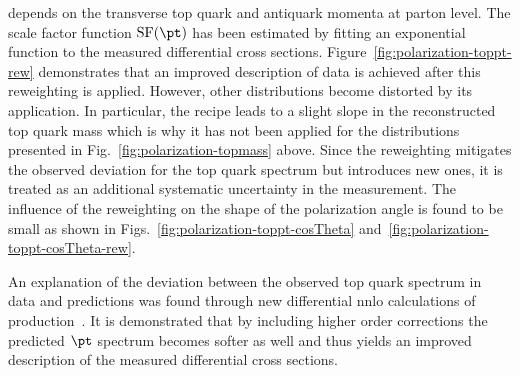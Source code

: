 depends on the transverse top quark and antiquark momenta at parton level. The scale factor function $\mathrm{SF}(\pt)$ has been estimated by fitting an exponential function to the measured differential \ttbar cross sections. Figure~\ref{fig:polarization-toppt-rew} demonstrates that an improved description of data is achieved after this reweighting is applied. However, other distributions become distorted by its application. In particular, the recipe leads to a slight slope in the reconstructed top quark mass which is why it has not been applied for the distributions presented in Fig.~\ref{fig:polarization-topmass} above. Since the reweighting mitigates the observed deviation for the top quark \pt spectrum but introduces new ones, it is treated as an additional systematic uncertainty in the measurement. The influence of the reweighting on the shape of the polarization angle is found to be small as shown in Figs.~\ref{fig:polarization-toppt-cosTheta} and~\ref{fig:polarization-toppt-cosTheta-rew}.


An explanation of the deviation between the observed top quark \pt spectrum in data and predictions was found through new differential \gls{nnlo} calculations of \ttbar production~\cite{Czakon:2015owf}. It is demonstrated that by including higher order corrections the predicted $\pt$ spectrum becomes softer as well and thus yields an improved description of the measured differential \ttbar cross sections.



